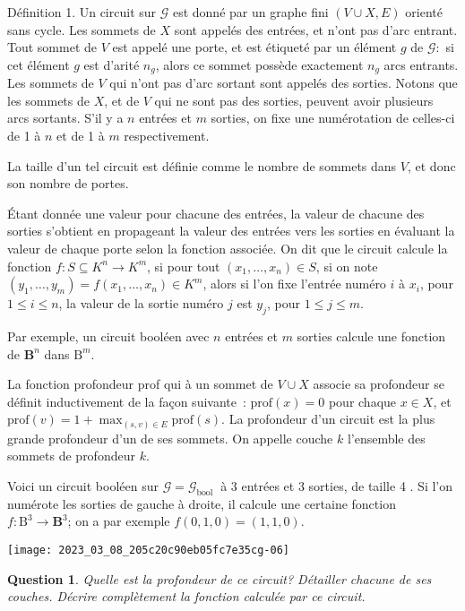 \documentclass[10pt]{article}
\newtheorem{question}{Question}
\begin{document}
Définition 1. Un circuit sur $\mathcal{G}$ est donné par un graphe fini $(V \cup X, E)$ orienté sans cycle. Les sommets de $X$ sont appelés des entrées, et n'ont pas d'arc entrant. Tout sommet de $V$ est appelé une porte, et est étiqueté par un élément $g$ de $\mathcal{G}:$ si cet élément $g$ est d'arité $n_{g}$, alors ce sommet possède exactement $n_{g}$ arcs entrants. Les sommets de $V$ qui n'ont pas d'arc sortant sont appelés des sorties. Notons que les sommets de $X$, et de $V$ qui ne sont pas des sorties, peuvent avoir plusieurs arcs sortants. S'il y a $n$ entrées et $m$ sorties, on fixe une numérotation de celles-ci de 1 à $n$ et de 1 à $m$ respectivement.

La taille d'un tel circuit est définie comme le nombre de sommets dans $V$, et donc son nombre de portes.

Étant donnée une valeur pour chacune des entrées, la valeur de chacune des sorties s'obtient en propageant la valeur des entrées vers les sorties en évaluant la valeur de chaque porte selon la fonction associée. On dit que le circuit calcule la fonction $f: S \subseteq K^{n} → K^{m}$, si pour tout $\left(x_{1}, \ldots, x_{n}\right) \in S$, si on note $\left(y_{1}, \ldots, y_{m}\right)=f\left(x_{1}, \ldots, x_{n}\right) \in K^{m}$, alors si l'on fixe l'entrée numéro $i$ à $x_{i}$, pour $1 ≤ i ≤ n$, la valeur de la sortie numéro $j$ est $y_{j}$, pour $1 ≤ j ≤ m$.

Par exemple, un circuit booléen avec $n$ entrées et $m$ sorties calcule une fonction de $\mathbf{B}^{n}$ dans $\mathrm{B}^{m}$.

La fonction profondeur prof qui à un sommet de $V \cup X$ associe sa profondeur se définit inductivement de la façon suivante : $\mathrm{prof}(x)=0$ pour chaque $x \in X$, et $\mathrm{prof}(v)=1+\max _{(s, v) \in E} \mathrm{prof}(s)$. La profondeur d'un circuit est la plus grande profondeur d'un de ses sommets. On appelle couche $k$ l'ensemble des sommets de profondeur $k$.

Voici un circuit booléen sur $\mathcal{G}=\mathcal{G}_{\text {bool }}$ à 3 entrées et 3 sorties, de taille 4 . Si l'on numérote les sorties de gauche à droite, il calcule une certaine fonction $f: \mathrm{B}^{3} → \mathbf{B}^{3}$; on a par exemple $f(0,1,0)=(1,1,0)$.

\begin{center}
\texttt{[image: 2023\_03\_08\_205c20c90eb05fc7e35cg-06]}
\end{center}

\begin{question}
	Quelle est la profondeur de ce circuit? Détailler chacune de ses couches. Décrire complètement la fonction calculée par ce circuit.
\end{question}
\end{document}
